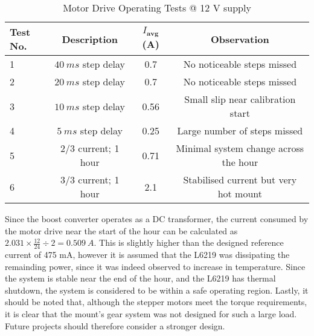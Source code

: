 \begin{table}[!htb]
  \centering
  \renewcommand{\arraystretch}{1.2}
  \begin{tabular}{ |p{0.8cm}|c|c|c| }
  \hline
  \textbf{Test No.}  & \textbf{Description} & \textbf{$I_{\textbf{avg}}$ (A)} & \textbf{Observation} \\
  \hline
  1
  & $\SI{40}{ms}$ step delay           
  & 0.7
  & No noticeable steps missed
  \\  \hline
  2
  & $\SI{20}{ms}$ step delay           
  & 0.7
  & No noticeable steps missed
  \\  \hline
  3
  & $\SI{10}{ms}$ step delay           
  & 0.56
  & Small slip near calibration start
  \\  \hline
  4
  & $\SI{5}{ms}$ step delay           
  & 0.25
  & Large number of steps missed
  \\  \hline
  5
  & 2/3 current; 1 hour
  & 0.71
  & Minimal system change across the hour
  \\  \hline
  6
  & 3/3 current; 1 hour
  & 2.1
  & Stabilised current but very hot mount
  \\  \hline
  \end{tabular}
  \caption{Motor Drive Operating Tests @ 12 V supply}
  \label{tab:motorDriveTests}
\end{table}

Since the boost converter operates as a DC transformer, the current consumed by the motor drive near the start of the hour can be calculated as $2.031 \times \frac{12}{24} \div 2 = \SI{0.509}{A}$. This is slightly higher than the designed reference current of 475 mA, however it is assumed that the L6219 was dissipating the remainding power, since it was indeed observed to increase in temperature. Since the system is stable near the end of the hour, and the L6219 has thermal shutdown, the system is considered to be within a safe operating region. Lastly, it should be noted that, although the stepper motors meet the torque requirements, it is clear that the mount's gear system was not designed for such a large load. Future projects should therefore consider a stronger design.